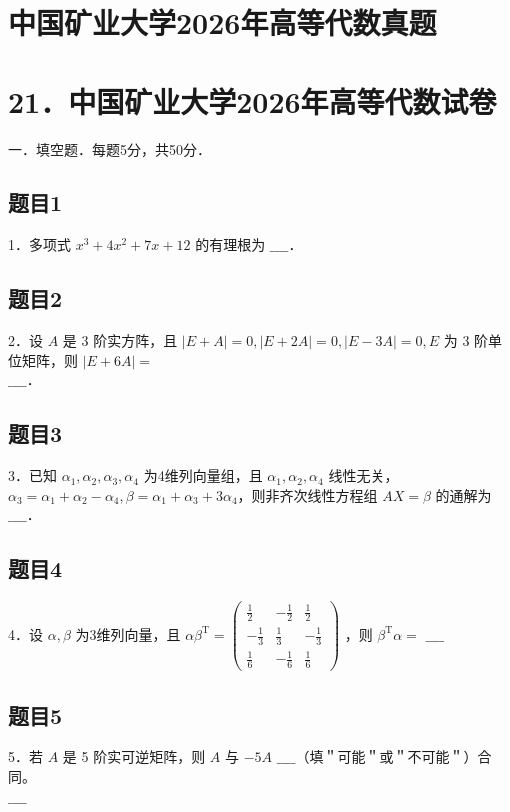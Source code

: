 \documentclass{article}
\begin{document}
\section*{中国矿业大学2026年高等代数真题}
\section*{21．中国矿业大学2026年高等代数试卷}
一．填空题．每题5分，共50分．\\

\subsection{题目1}
1．多项式 \(x^{3}+4 x^{2}+7 x+12\) 的有理根为 \(\_\_\_\_\)．

\subsection{题目2}
2．设 \(A\) 是 3 阶实方阵，且 \(|E+A|=0,|E+2 A|=0,|E-3 A|=0, E\) 为 3 阶单位矩阵，则 \(|E+6 A|=\)\\
\(\_\_\_\_\)．

\subsection{题目3}
3．已知 \(\alpha_{1}, \alpha_{2}, \alpha_{3}, \alpha_{4}\) 为4维列向量组，且 \(\alpha_{1}, \alpha_{2}, \alpha_{4}\) 线性无关，\(\alpha_{3}=\alpha_{1}+\alpha_{2}-\alpha_{4}, \beta=\alpha_{1}+\alpha_{3}+3 \alpha_{4}\)，则非齐次线性方程组 \(A X=\beta\) 的通解为 \(\_\_\_\_\)．

\subsection{题目4}
4．设 \(\alpha, \beta\) 为3维列向量，且 \(\alpha \beta^{\mathrm{T}}=\left(\begin{array}{ccc}\frac{1}{2} & -\frac{1}{2} & \frac{1}{2} \\ -\frac{1}{3} & \frac{1}{3} & -\frac{1}{3} \\ \frac{1}{6} & -\frac{1}{6} & \frac{1}{6}\end{array}\right)\) ，则 \(\beta^{\mathrm{T}} \alpha=\) \(\_\_\_\_\)

\subsection{题目5}
5．若 \(A\) 是 5 阶实可逆矩阵，则 \(A\) 与 \(-5 A\) \(\_\_\_\_\)（填＂可能＂或＂不可能＂）合同。\\
\(\_\_\_\_\)
\end{document}
